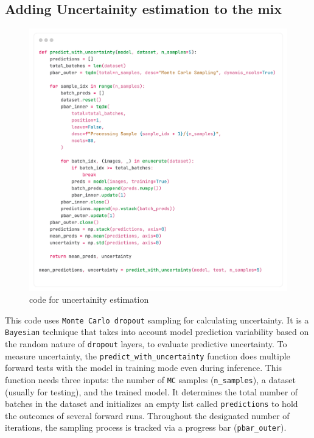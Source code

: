 \documentclass[12pt,onecolumn]{report}
\begin{document}
\subsection{Adding Uncertainity estimation to the mix}
\begin{figure}[H]
    \centering
    \includegraphics[width=0.8\columnwidth]{figures/imp_uncertainity_estimation.png}  %
    \caption{code for uncertainity estimation} %
    \label{fig:imp_uncertainity_estimation} %
\end{figure}
This code uses \texttt{Monte Carlo dropout} sampling for calculating uncertainty. It is a \texttt{Bayesian} technique that takes into account model prediction variability based on the random nature of \texttt{dropout} layers, to evaluate predictive uncertainty. To measure uncertainty, the \texttt{predict\_with\_uncertainty} function does multiple forward tests with the model in training mode even during inference. This function needs three inputs: the number of \texttt{MC} samples (\texttt{n\_samples}), a dataset (usually for testing), and the trained model. It determines the total number of batches in the dataset and initializes an empty list called \texttt{predictions} to hold the outcomes of several forward runs. Throughout the designated number of iterations, the sampling process is tracked via a progress bar (\texttt{pbar\_outer}).
\end{document}
